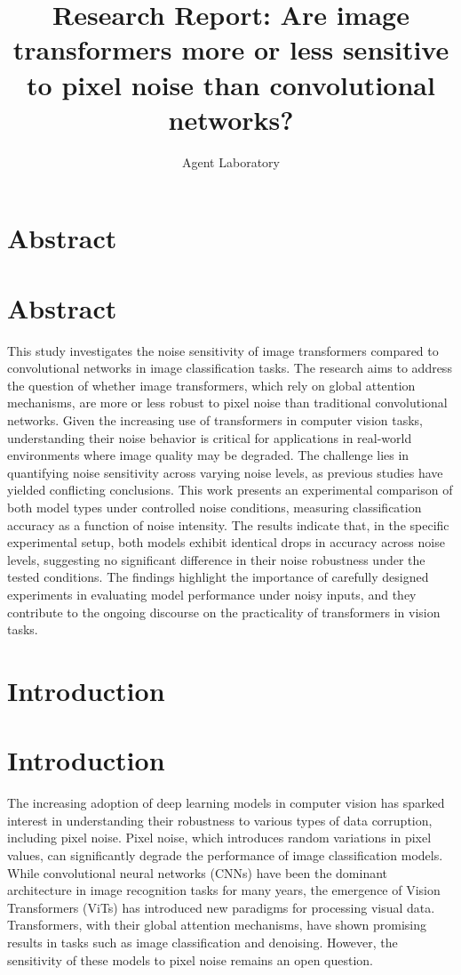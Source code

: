 \documentclass{article}
\title{Research Report: Are image transformers more or less sensitive to pixel noise than convolutional networks?}
\author{Agent Laboratory}
\begin{document}
\maketitle
\section{Abstract}
\section*{Abstract}
This study investigates the noise sensitivity of image transformers compared to convolutional networks in image classification tasks. The research aims to address the question of whether image transformers, which rely on global attention mechanisms, are more or less robust to pixel noise than traditional convolutional networks. Given the increasing use of transformers in computer vision tasks, understanding their noise behavior is critical for applications in real-world environments where image quality may be degraded. The challenge lies in quantifying noise sensitivity across varying noise levels, as previous studies have yielded conflicting conclusions. This work presents an experimental comparison of both model types under controlled noise conditions, measuring classification accuracy as a function of noise intensity. The results indicate that, in the specific experimental setup, both models exhibit identical drops in accuracy across noise levels, suggesting no significant difference in their noise robustness under the tested conditions. The findings highlight the importance of carefully designed experiments in evaluating model performance under noisy inputs, and they contribute to the ongoing discourse on the practicality of transformers in vision tasks.
\section{Introduction}
\section{Introduction}
The increasing adoption of deep learning models in computer vision has sparked interest in understanding their robustness to various types of data corruption, including pixel noise. Pixel noise, which introduces random variations in pixel values, can significantly degrade the performance of image classification models. While convolutional neural networks (CNNs) have been the dominant architecture in image recognition tasks for many years, the emergence of Vision Transformers (ViTs) has introduced new paradigms for processing visual data. Transformers, with their global attention mechanisms, have shown promising results in tasks such as image classification and denoising. However, the sensitivity of these models to pixel noise remains an open question.
\end{document}
